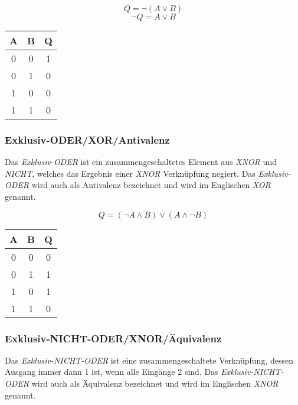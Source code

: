 \documentclass[a4paper, 12pt]{report}
\begin{document}
\begin{center}
	\begin{equation}
		Q = \neg(A \lor B)
	\end{equation}
	\begin{equation}
		\neg Q = A \lor B
	\end{equation}
   \begin{tabular}{ | c | c || c | }
    	\hline
    	A & B & Q \\ \hline
    	0 & 0 & 1 \\ \hline
    	0 & 1 & 0 \\ \hline
    	1 & 0 & 0 \\ \hline
    	1 & 1 & 0 \\ 
    	\hline
    \end{tabular}
\end{center}

\subsubsection{Exklusiv-ODER/XOR/Antivalenz}

Das \emph{Exklusiv-ODER} ist ein zusammengeschaltetes Element aus \emph{XNOR} 
und \emph{NICHT}, welches das Ergebnis einer \emph{XNOR} Verknüpfung negiert. 
Das \emph{Exklusiv-ODER} wird auch als Antivalenz bezeichnet und wird im 
Englischen \emph{XOR} genannt. 

\begin{center}
	\begin{equation}
		Q = (\neg A \land B) \lor (A \land \neg B)
	\end{equation}
   \begin{tabular}{ | c | c || c | }
    	\hline
    	A & B & Q \\ \hline
    	0 & 0 & 0 \\ \hline
    	0 & 1 & 1 \\ \hline
    	1 & 0 & 1 \\ \hline
    	1 & 1 & 0 \\ 
    	\hline
    \end{tabular}
\end{center}

\subsubsection{Exklusiv-NICHT-ODER/XNOR/Äquivalenz}

Das \emph{Exklusiv-NICHT-ODER} ist eine zusammengeschaltete Verknüpfung, dessen 
Ausgang immer dann 1 ist, wenn alle Eingänge 2 sind. Das 
\emph{Exklusiv-NICHT-ODER} wird auch als Äquivalenz bezeichnet und wird im 
Englischen \emph{XNOR} genannt. 
\end{document}

